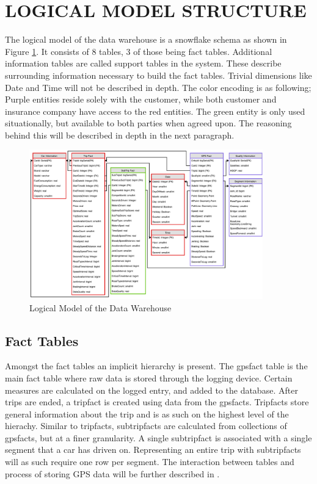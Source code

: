 \section{LOGICAL MODEL STRUCTURE}\label{sec:dataware}

The logical model of the data warehouse is a snowflake schema as shown in Figure \ref{fig:datawarehouse}. It consists of 8 tables, 3 of those being fact tables. Additional information tables are called support tables in the system. These describe surrounding information necessary to build the fact tables. Trivial dimensions like Date and Time will not be described in depth. The color encoding is as following; Purple entities reside solely with the customer, while both customer and insurance company have access to the red entities. The green entity is only used situationally, but available to both parties when agreed upon. The reasoning behind this will be described in depth in the next paragraph.

\begin{figure}[tb]
\centering
\includegraphics[width=0.9\textwidth]{Pictures/ERDiagram}
\caption{Logical Model of the Data Warehouse}
\label{fig:datawarehouse}
\end{figure}

\subsection{Fact Tables}
Amongst the fact tables an implicit hierarchy is present. The gpsfact table is the main fact table where raw data is stored through the logging device. Certain measures are calculated on the logged entry, and added to the database. After trips are ended, a tripfact is created using data from the gpsfacts. Tripfacts store general information about the trip and is as such on the highest level of the hierachy. Similar to tripfacts, subtripfacts are calculated from collections of gpsfacts, but at a finer granularity. A single subtripfact is associated with a single segment that a car has driven on. Representing an entire trip with subtripfacts will as such require one row per segment. The interaction between tables and process of storing GPS data will be further described in . 

